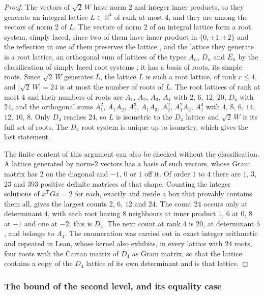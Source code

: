 \documentclass[11pt,reqno]{amsart}
\renewcommand{\_}{\origunderscore\allowbreak}
\numberwithin{equation}{section}
\theoremstyle{plain}
\theoremstyle{definition}
\theoremstyle{remark}
\begin{document}
\begin{proof}
The vectors of $\sqrt2\,W$ have norm $2$ and integer inner products, so
they generate an integral lattice $L\subset\mathbb{R}^4$ of rank at most
$4$, and they are among the vectors of norm $2$ of $L$. The vectors of
norm $2$ of an integral lattice form a root system, simply laced, since
two of them have inner product in $\{0,\pm1,\pm2\}$ and the reflection
in one of them preserves the lattice
\cite[Ch.~4]{CS1988}, and the lattice they generate is a root
lattice, an orthogonal sum of lattices of the types $A_n$, $D_n$ and
$E_n$ by the classification of simply laced root systems
\cite[Ch.~2]{Hum90}; it has a basis of roots, its simple roots. Since
$\sqrt2\,W$ generates $L$, the lattice $L$ is such a root lattice, of
rank $r\le4$, and $|\sqrt2\,W|=24$ is at most the number of roots of
$L$. The root lattices of rank at most $4$ and their numbers of roots
are $A_1$, $A_2$, $A_3$, $A_4$ with $2$, $6$, $12$, $20$, $D_4$ with
$24$, and the orthogonal sums $A_1^2$, $A_1A_2$, $A_1^3$, $A_1A_3$,
$A_2^2$, $A_1^2A_2$, $A_1^4$ with $4$, $8$, $6$, $14$, $12$, $10$, $8$.
Only $D_4$ reaches $24$, so $L$ is isometric to the $D_4$ lattice and
$\sqrt2\,W$ is its full set of roots. The $D_4$ root system is unique up
to isometry, which gives the last statement.

The finite content of this argument can also be checked without the
classification. A lattice generated by norm-$2$ vectors has a basis of
such vectors, whose Gram matrix has $2$ on the diagonal and $-1$, $0$
or $1$ off it. Of order $1$ to $4$ there are $1$, $3$, $23$ and $393$
positive definite matrices of that shape. Counting the integer
solutions of $x^{\mathsf T}Gx=2$ for each, exactly and inside a box
that provably contains them all, gives the largest counts $2$, $6$,
$12$ and $24$. The count $24$ occurs only at determinant $4$, with each
root having $8$ neighbours at inner product $1$, $6$ at $0$, $8$ at
$-1$ and one at $-2$; this is $D_4$. The next count at rank $4$ is
$20$, at determinant $5$, and belongs to $A_4$. The enumeration was
carried out in exact integer arithmetic and repeated in Lean, whose
kernel also exhibits, in every lattice with $24$ roots, four roots with
the Cartan matrix of $D_4$ as Gram matrix, so that the lattice contains
a copy of the $D_4$ lattice of its own determinant and is that lattice.
\end{proof}

\subsubsection{The bound of the second level, and its equality case}
\label{sec:las2}
\end{document}
